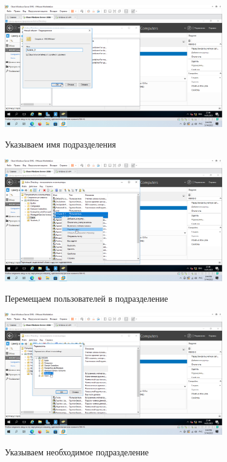 \documentclass[a4paper]{article}
\begin{document}
  \begin{figure}[H]
    \centering
    \includegraphics[width=0.85\textwidth]{5_0101}
    \label{img:101}
    \caption{Указываем имя подразделения}
  \end{figure}

  \begin{figure}[H]
    \centering
    \includegraphics[width=0.85\textwidth]{5_0102}
    \label{img:102}
    \caption{Перемещаем пользователей в подразделение}
  \end{figure}

  \begin{figure}[H]
    \centering
    \includegraphics[width=0.85\textwidth]{5_0103}
    \label{img:103}
    \caption{Указываем необходимое подразделение}
  \end{figure}
\end{document}
